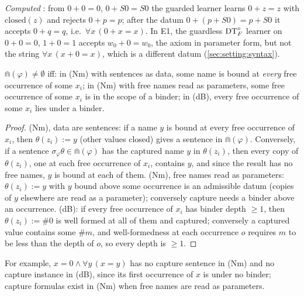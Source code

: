 \emph{Computed} : from $0+0=0$, $0+S0=S0$ the guarded learner learns $0+z=z$ with $\mathrm{closed}(z)$ and rejects $0+p=p$; after the datum $0+(p+S0)=p+S0$ it accepts $0+q=q$, i.e.\ $\forall x\,(0+x=x)$. In E1, the guardless $\mathrm{DT}^{\circ}_{F}$ learner on $0+0=0$, $1+0=1$ accepts $w_0+0=w_0$, the axiom in parameter form, but not the string $\forall x\,(x+0=x)$, which is a different datum (\cref{sec:setting:syntax}).

\begin{lemma}\label{lem:univ:capcrit}
$\Cap(\varphi)\neq\emptyset$ iff: in (Nm) with sentences as data, some name is bound at \emph{every} free occurrence of some $x_i$; in (Nm) with free names read as parameters, some free occurrence of some $x_i$ is in the scope of a binder; in (dB), every free occurrence of some $x_i$ lies under a binder.
\end{lemma}

\begin{proof}
(Nm), data are sentences: if a name $y$ is bound at every free occurrence of $x_i$, then $\theta(z_i):=y$ (other values closed) gives a sentence in $\Cap(\varphi)$. Conversely, if a sentence $\sigma_\varphi\theta\in\Cap(\varphi)$ has the captured name $y$ in $\theta(z_i)$, then every copy of $\theta(z_i)$, one at each free occurrence of $x_i$, contains $y$, and since the result has no free names, $y$ is bound at each of them. (Nm), free names read as parameters: $\theta(z_i):=y$ with $y$ bound above some occurrence is an admissible datum (copies of $y$ elsewhere are read as a parameter); conversely capture needs a binder above an occurrence. (dB): if every free occurrence of $x_i$ has binder depth $\ge1$, then $\theta(z_i):=\#0$ is well formed at all of them and captured; conversely a captured value contains some $\#m$, and well-formedness at each occurrence $o$ requires $m$ to be less than the depth of $o$, so every depth is $\ge1$.
\end{proof}

\noindent For example, $x=0\wedge\forall y\,(x=y)$ has no capture sentence in (Nm) and no capture instance in (dB), since its first occurrence of $x$ is under no binder; capture formulas exist in (Nm) when free names are read as parameters.

